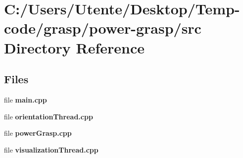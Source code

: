 \section{C\+:/\+Users/\+Utente/\+Desktop/\+Temp-\/code/grasp/power-\/grasp/src Directory Reference}
\label{dir_bb53a4e1b5ec10e573c3549b66ff0295}
\subsection*{Files}
\begin{DoxyCompactItemize}
\item 
file {\bfseries main.\+cpp}
\item 
file {\bfseries orientation\+Thread.\+cpp}
\item 
file {\bfseries power\+Grasp.\+cpp}
\item 
file {\bfseries visualization\+Thread.\+cpp}
\end{DoxyCompactItemize}
